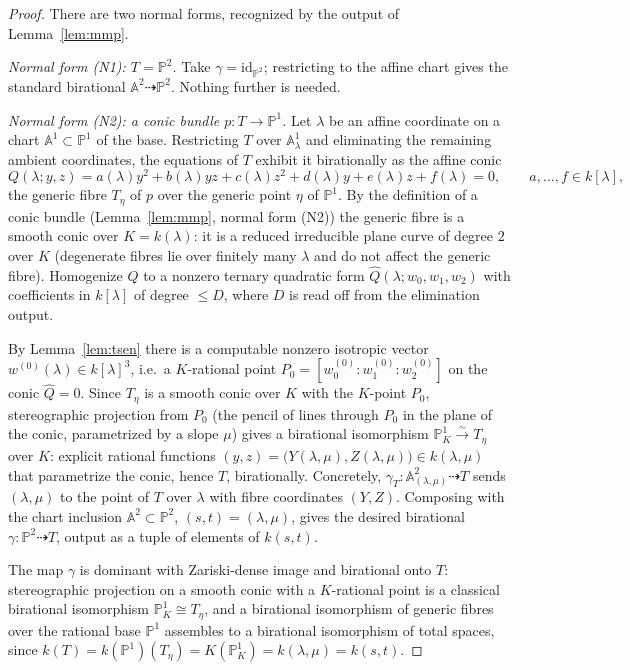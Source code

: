 \documentclass{amsart}
\theoremstyle{plain}
\theoremstyle{definition}
\newcommand{\PP}{\mathbb{P}}
\newcommand{\AA}{\mathbb{A}}
\begin{document}
\begin{proof}
There are two normal forms, recognized by the output of Lemma~\ref{lem:mmp}.

\medskip
\emph{Normal form \textup{(N1)}: $T=\PP^2$.}  Take $\gamma=\mathrm{id}_{\PP^2}$;
restricting to the affine chart gives the standard birational
$\AA^2\dashrightarrow\PP^2$.  Nothing further is needed.

\medskip
\emph{Normal form \textup{(N2)}: a conic bundle $p\colon T\to\PP^1$.}
Let $\lambda$ be an affine coordinate on a chart $\AA^1\subset\PP^1$ of the base.
Restricting $T$ over $\AA^1_\lambda$ and eliminating the remaining ambient
coordinates, the equations of $T$ exhibit it birationally as the affine conic
\[
Q(\lambda;y,z)=a(\lambda)y^2+b(\lambda)yz+c(\lambda)z^2+d(\lambda)y+e(\lambda)z
+f(\lambda)=0,\qquad a,\dots,f\in k[\lambda],
\]
the generic fibre $T_\eta$ of $p$ over the generic point $\eta$ of $\PP^1$.  By
the definition of a conic bundle (Lemma~\ref{lem:mmp}, normal form (N2)) the
generic fibre is a smooth conic over $K=k(\lambda)$: it is a reduced irreducible
plane curve of degree $2$ over $K$ (degenerate fibres lie over finitely many
$\lambda$ and do not affect the generic fibre).  Homogenize $Q$ to a nonzero
ternary quadratic form $\widehat Q(\lambda;w_0,w_1,w_2)$ with coefficients in
$k[\lambda]$ of degree $\le D$, where $D$ is read off from the elimination
output.

By Lemma~\ref{lem:tsen} there is a computable nonzero isotropic vector
$w^{(0)}(\lambda)\in k[\lambda]^3$, i.e.\ a $K$-rational point
$P_0=[w_0^{(0)}:w_1^{(0)}:w_2^{(0)}]$ on the conic $\widehat Q=0$.  Since
$T_\eta$ is a smooth conic over $K$ with the $K$-point $P_0$, stereographic
projection from $P_0$ (the pencil of lines through $P_0$ in the plane of the
conic, parametrized by a slope $\mu$) gives a birational isomorphism
$\PP^1_K\xrightarrow{\sim}T_\eta$ over $K$: explicit rational functions
$(y,z)=\big(Y(\lambda,\mu),Z(\lambda,\mu)\big)\in k(\lambda,\mu)$ that
parametrize the conic, hence $T$, birationally.  Concretely,
$\gamma_T\colon\AA^2_{(\lambda,\mu)}\dashrightarrow T$ sends $(\lambda,\mu)$ to
the point of $T$ over $\lambda$ with fibre coordinates $(Y,Z)$.  Composing with
the chart inclusion $\AA^2\subset\PP^2$, $(s,t)=(\lambda,\mu)$, gives the desired
birational $\gamma\colon\PP^2\dashrightarrow T$, output as a tuple of elements of
$k(s,t)$.

The map $\gamma$ is dominant with Zariski-dense image and birational onto $T$:
stereographic projection on a smooth conic with a $K$-rational point is a
classical birational isomorphism $\PP^1_K\cong T_\eta$, and a birational
isomorphism of generic fibres over the rational base $\PP^1$ assembles to a
birational isomorphism of total spaces, since $k(T)=k(\PP^1)(T_\eta)=
K(\PP^1_K)=k(\lambda,\mu)=k(s,t)$.
\end{proof}
\end{document}
